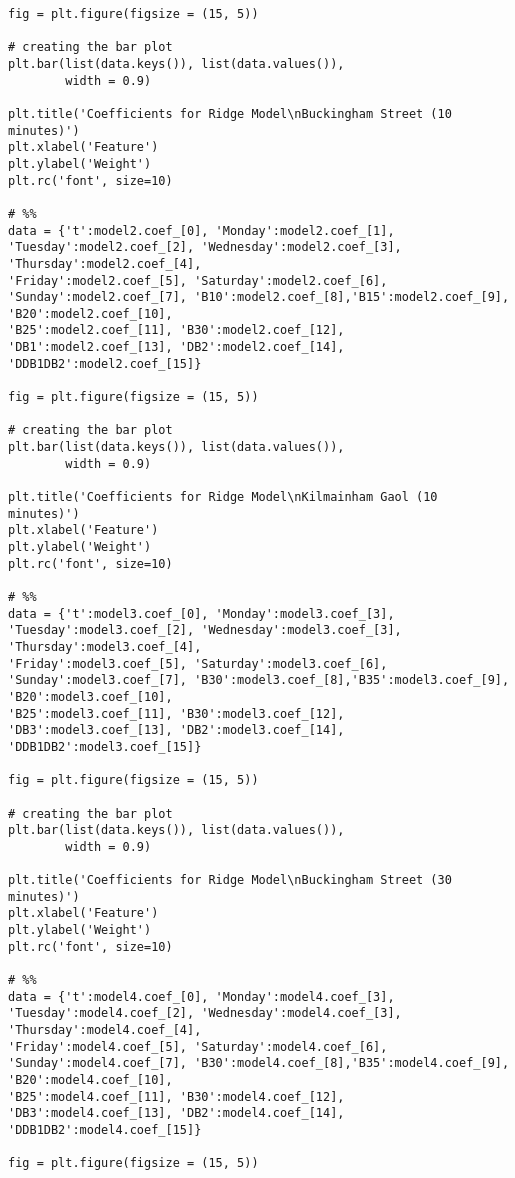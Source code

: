 \begin{verbatim}
fig = plt.figure(figsize = (15, 5))
 
# creating the bar plot
plt.bar(list(data.keys()), list(data.values()),
        width = 0.9)

plt.title('Coefficients for Ridge Model\nBuckingham Street (10 minutes)')
plt.xlabel('Feature')
plt.ylabel('Weight')
plt.rc('font', size=10)

# %%
data = {'t':model2.coef_[0], 'Monday':model2.coef_[1], 'Tuesday':model2.coef_[2], 'Wednesday':model2.coef_[3], 'Thursday':model2.coef_[4],
'Friday':model2.coef_[5], 'Saturday':model2.coef_[6], 'Sunday':model2.coef_[7], 'B10':model2.coef_[8],'B15':model2.coef_[9], 'B20':model2.coef_[10],
'B25':model2.coef_[11], 'B30':model2.coef_[12], 'DB1':model2.coef_[13], 'DB2':model2.coef_[14], 'DDB1DB2':model2.coef_[15]}

fig = plt.figure(figsize = (15, 5))
 
# creating the bar plot
plt.bar(list(data.keys()), list(data.values()),
        width = 0.9)

plt.title('Coefficients for Ridge Model\nKilmainham Gaol (10 minutes)')
plt.xlabel('Feature')
plt.ylabel('Weight')
plt.rc('font', size=10)

# %%
data = {'t':model3.coef_[0], 'Monday':model3.coef_[3], 'Tuesday':model3.coef_[2], 'Wednesday':model3.coef_[3], 'Thursday':model3.coef_[4],
'Friday':model3.coef_[5], 'Saturday':model3.coef_[6], 'Sunday':model3.coef_[7], 'B30':model3.coef_[8],'B35':model3.coef_[9], 'B20':model3.coef_[10],
'B25':model3.coef_[11], 'B30':model3.coef_[12], 'DB3':model3.coef_[13], 'DB2':model3.coef_[14], 'DDB1DB2':model3.coef_[15]}

fig = plt.figure(figsize = (15, 5))
 
# creating the bar plot
plt.bar(list(data.keys()), list(data.values()),
        width = 0.9)

plt.title('Coefficients for Ridge Model\nBuckingham Street (30 minutes)')
plt.xlabel('Feature')
plt.ylabel('Weight')
plt.rc('font', size=10)

# %%
data = {'t':model4.coef_[0], 'Monday':model4.coef_[3], 'Tuesday':model4.coef_[2], 'Wednesday':model4.coef_[3], 'Thursday':model4.coef_[4],
'Friday':model4.coef_[5], 'Saturday':model4.coef_[6], 'Sunday':model4.coef_[7], 'B30':model4.coef_[8],'B35':model4.coef_[9], 'B20':model4.coef_[10],
'B25':model4.coef_[11], 'B30':model4.coef_[12], 'DB3':model4.coef_[13], 'DB2':model4.coef_[14], 'DDB1DB2':model4.coef_[15]}

fig = plt.figure(figsize = (15, 5))
 

\end{verbatim}

